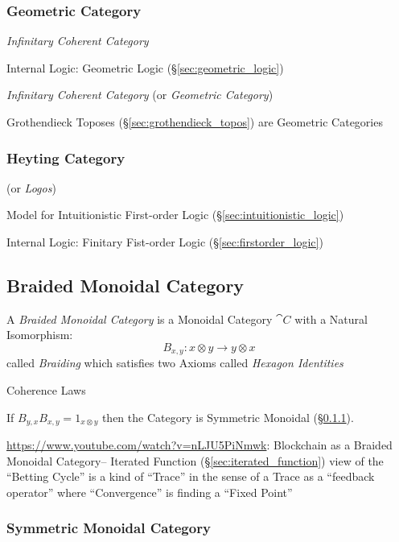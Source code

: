 \subsubsection{Geometric Category}\label{sec:geometric_category}

\emph{Infinitary Coherent Category}

Internal Logic: Geometric Logic (\S\ref{sec:geometric_logic})

\emph{Infinitary Coherent Category} (or \emph{Geometric Category})

Grothendieck Toposes (\S\ref{sec:grothendieck_topos}) are Geometric
Categories



\subsubsection{Heyting Category}\label{sec:heyting_category}

(or \emph{Logos})

Model for Intuitionistic First-order Logic
(\S\ref{sec:intuitionistic_logic})

Internal Logic: Finitary Fist-order Logic
(\S\ref{sec:firstorder_logic})



\subsection{Braided Monoidal Category}\label{sec:braided_monoidal}

A \emph{Braided Monoidal Category} is a Monoidal Category $\cat{C}$ with a
Natural Isomorphism:
\[
  B_{x,y} : x \otimes y \rightarrow y \otimes x
\]
called \emph{Braiding} which satisfies two Axioms called \emph{Hexagon
  Identities} %

Coherence Laws

If $B_{y,x} B_{x,y} = 1_{x \otimes y}$ then the Category is Symmetric
Monoidal (\S\ref{sec:symmetric_monoidal}).

\url{https://www.youtube.com/watch?v=nLJU5PiNmwk}: Blockchain as a Braided
Monoidal Category-- Iterated Function (\S\ref{sec:iterated_function}) view of
the ``Betting Cycle'' is a kind of ``Trace'' in the sense of a Trace as a
``feedback operator'' where ``Convergence'' is finding a ``Fixed Point''



\subsubsection{Symmetric Monoidal Category}\label{sec:symmetric_monoidal}

